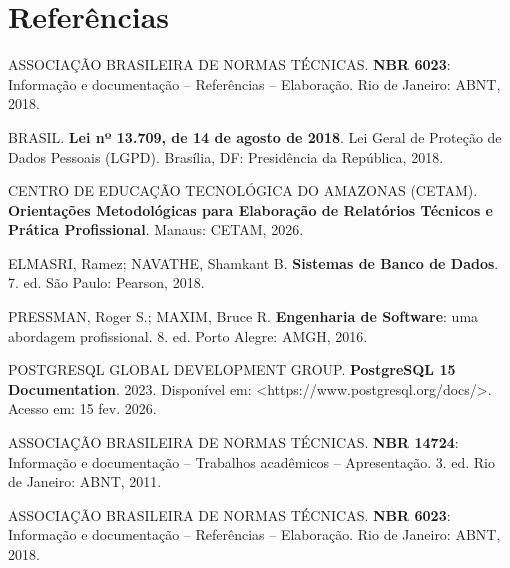 \documentclass[12pt,a4paper]{article}
\begin{document}
\newpage


\section{Referências}

\noindent ASSOCIAÇÃO BRASILEIRA DE NORMAS TÉCNICAS. \textbf{NBR 6023}: Informação e documentação -- Referências -- Elaboração. Rio de Janeiro: ABNT, 2018.

\vspace{0.5cm}

\noindent BRASIL. \textbf{Lei nº 13.709, de 14 de agosto de 2018}. Lei Geral de Proteção de Dados Pessoais (LGPD). Brasília, DF: Presidência da República, 2018.

\vspace{0.5cm}

\noindent CENTRO DE EDUCAÇÃO TECNOLÓGICA DO AMAZONAS (CETAM). \textbf{Orientações Metodológicas para Elaboração de Relatórios Técnicos e Prática Profissional}. Manaus: CETAM, 2026.

\vspace{0.5cm}

\noindent ELMASRI, Ramez; NAVATHE, Shamkant B. \textbf{Sistemas de Banco de Dados}. 7. ed. São Paulo: Pearson, 2018.

\vspace{0.5cm}

\noindent PRESSMAN, Roger S.; MAXIM, Bruce R. \textbf{Engenharia de Software}: uma abordagem profissional. 8. ed. Porto Alegre: AMGH, 2016.

\vspace{0.5cm}

\noindent POSTGRESQL GLOBAL DEVELOPMENT GROUP. \textbf{PostgreSQL 15 Documentation}. 2023. Disponível em: \textless https://www.postgresql.org/docs/\textgreater. Acesso em: 15 fev. 2026.

\noindent ASSOCIAÇÃO BRASILEIRA DE NORMAS TÉCNICAS. \textbf{NBR 14724}: Informação e documentação -- Trabalhos acadêmicos -- Apresentação. 3. ed. Rio de Janeiro: ABNT, 2011.

\vspace{0.5cm}

\noindent ASSOCIAÇÃO BRASILEIRA DE NORMAS TÉCNICAS. \textbf{NBR 6023}: Informação e documentação -- Referências -- Elaboração. Rio de Janeiro: ABNT, 2018.
\end{document}
